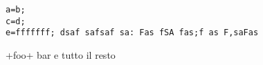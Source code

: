\documentclass[12pt]{article}
\begin{document}
\begin{verbatim}
a=b;
c=d;
e=fffffff; dsaf safsaf sa: Fas fSA fas;f as F,saFas
\end{verbatim}

\jscode+foo+ bar e tutto il resto
\end{document}
